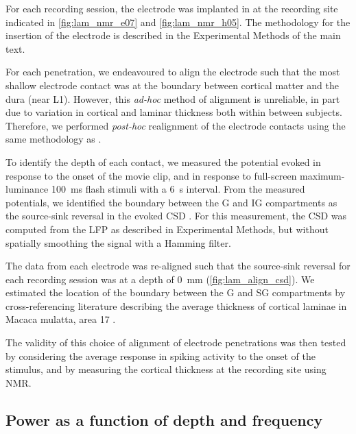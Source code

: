 For each recording session, the electrode was implanted in  at the recording site indicated in \autoref{fig:lam_nmr_e07} and \autoref{fig:lam_nmr_h05}.
The methodology for the insertion of the electrode is described in the Experimental Methods of the main text.

For each penetration, we endeavoured to align the electrode such that the most shallow electrode contact was at the boundary between cortical matter and the dura (near \ac{L1}).
However, this \textit{ad-hoc} method of alignment is unreliable, in part due to variation in cortical and laminar thickness both within between subjects.
Therefore, we performed \textit{post-hoc} realignment of the electrode contacts using the same methodology as \citet{Self2013,VanKerkoerle2014}.

To identify the depth of each contact, we measured the potential evoked in response to the onset of the movie clip, and in response to full-screen maximum-luminance \SI{100}{\milli\second} flash stimuli with a \SI{6}{\second} interval.
From the measured potentials, we identified the boundary between the \ac{G} and \ac{IG} compartments as the source-sink reversal in the evoked \ac{CSD} \citep{Mitzdorf1979,Mitzdorf1985}.
For this measurement, the \ac{CSD} was computed from the \ac{LFP} as described in Experimental Methods, but without spatially smoothing the signal with a Hamming filter.

The data from each electrode was re-aligned such that the source-sink reversal for each recording session was at a depth of \SI{0}{\milli\metre} (\autoref{fig:lam_align_csd}).
We estimated the location of the boundary between the \ac{G} and \ac{SG} compartments by cross-referencing literature describing the average thickness of cortical laminae in Macaca mulatta, area 17 \citep{Lund1973,OKusky1982}.

The validity of this choice of alignment of electrode penetrations was then tested by considering the average response in spiking activity to the onset of the stimulus, and by measuring the cortical thickness at the recording site using \ac{NMR}.


\subsection{Power as a function of depth and frequency}

